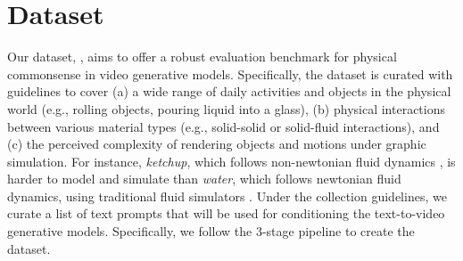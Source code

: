 
\section{\name{} Dataset}
\label{sec:dataset_creation}

Our dataset, \name{}, aims to offer a robust evaluation benchmark for physical commonsense in video generative models. Specifically, the dataset is curated with guidelines to cover (a) a wide range of daily activities and objects in the physical world (e.g., rolling objects, pouring liquid into a glass), (b) physical interactions between various material types (e.g., solid-solid or solid-fluid interactions), and (c) the perceived complexity of rendering objects and motions under graphic simulation. For instance, \textit{ketchup}, which follows non-newtonian fluid dynamics \cite{witczak2011non}, is harder to model and simulate than \textit{water}, which follows newtonian fluid dynamics, using traditional fluid simulators \cite{bridson2015fluid}. Under the collection guidelines, we curate a list of text prompts that will be used for conditioning the text-to-video generative models. Specifically, we follow the 3-stage pipeline to create the dataset.


